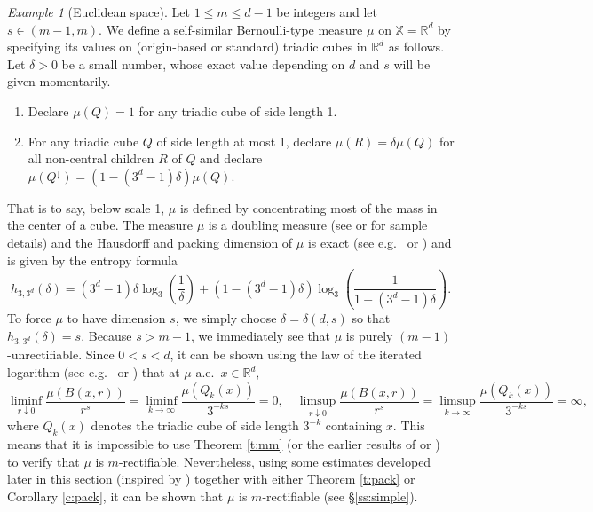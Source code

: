 \documentclass[12pt]{amsart}
\theoremstyle{definition}
\theoremstyle{remark}
\newtheorem{example}[theorem]{Example}
\newcommand{\RR}{\mathbb{R}}
\newcommand{\XX}{\mathbb{X}}
\numberwithin{figure}{section}
\numberwithin{equation}{section}
\begin{document}
\begin{example}[Euclidean space] \label{ex:Euc-1} Let $1\leq m\leq d-1$ be integers and let $s\in(m-1,m)$. We define a self-similar Bernoulli-type measure $\mu$ on $\XX=\RR^d$ by specifying its values on (origin-based or standard) triadic cubes in $\RR^d$ as follows. Let $\delta>0$ be a small number, whose exact value depending on $d$ and $s$ will be given momentarily.\begin{enumerate}
\item Declare $\mu(Q)=1$ for any triadic cube of side length 1.
\item For any triadic cube $Q$ of side length at most 1, declare $\mu(R)=\delta \mu(Q)$ for all non-central children $R$ of $Q$ and  declare $\mu(Q^\downarrow)=(1-(3^d-1)\delta)\mu(Q)$.
\end{enumerate} That is to say, below scale 1, $\mu$ is defined by concentrating most of the mass in the center of a cube. The measure $\mu$ is a doubling measure (see \cite[\S8.2]{BLZ} or \cite[\S3]{KRS-cubes}  for sample details) and the Hausdorff and packing dimension of $\mu$ is exact (see e.g.~\cite{dimension-of-measures} or \cite[\S1.5]{bishop-peres}) and is given by the entropy formula \begin{equation} h_{3,3^d}(\delta)=(3^d-1)\delta\log_3\left(\frac{1}{\delta}\right)+(1-(3^d-1)\delta)\log_3\left(\frac{1}{1-(3^d-1)\delta}\right).
\end{equation} To force $\mu$ to have dimension $s$, we simply choose $\delta=\delta(d,s)$ so that $h_{3,3^d}(\delta)=s$. Because $s>m-1$, we immediately see that $\mu$ is purely $(m-1)$-unrectifiable. Since $0<s<d$, it can be shown using the law of the iterated logarithm (see e.g.~\cite[Theorem 3.1]{measure-lil} or \cite[Theorem 1.1]{ifs-density}) that at $\mu$-a.e.~$x\in\RR^d$, \begin{equation}\label{limsup-infinity} \displaystyle\liminf_{r\downarrow 0}\dfrac{\mu(B(x,r))}{r^s}=\displaystyle\liminf_{k\rightarrow\infty}\dfrac{\mu(Q_k(x))}{3^{-ks}}=0,\quad \displaystyle\limsup_{r\downarrow 0}\dfrac{\mu(B(x,r))}{r^s}=\displaystyle\limsup_{k\rightarrow\infty}\dfrac{\mu(Q_k(x))}{3^{-ks}}=\infty,\end{equation} where $Q_k(x)$ denotes the triadic cube of side length $3^{-k}$ containing $x$. This means that it is impossible to use Theorem \ref{t:mm} (or the earlier results of \cite{MM1988} or \cite{BV}) to verify that $\mu$ is $m$-rectifiable. Nevertheless, using some estimates developed later in this section (inspired by \cite{GKS}) together with either Theorem \ref{t:pack} or Corollary \ref{c:pack}, it can be shown that $\mu$ is $m$-rectifiable (see \S\ref{ss:simple}).
\end{example}
\end{document}
